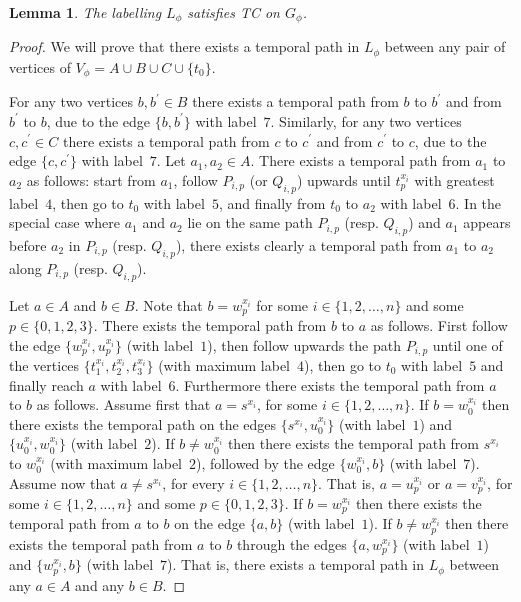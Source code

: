 \documentclass[a4paper,UKenglish]{article}
\newtheorem{lemma}{Lemma}
\begin{document}
\begin{lemma}
\label{lambda-reachabilities-preserve-lem}
The labelling $L_{\phi }$ satisfies TC on $G_{\phi} $.
\end{lemma}

\begin{proof}
We will prove that there exists a temporal path in $L _{\phi }$
between any pair of vertices of $V_{\phi }=A\cup B\cup C\cup \{t_{0}\}$. 

For any two vertices $b,b^{\prime }\in B$ there exists a temporal path from $b$ to $b^{\prime }$ and from $b^{\prime }$ to $b$, due to the edge $\{ b , b^{\prime }  \}$ with label~$7$. Similarly, for any two vertices $c,c^{\prime
}\in C$ there exists a temporal path from $c$ to $c^{\prime }$ and from $c^{\prime }$ to $c$, due to the edge $  \{  c  ,  c^{\prime }  \}  $ with label~$7$. Let $a_{1},a_{2}\in A$. There exists a temporal path from $a_{1}$ to $a_{2}$ as
follows: start from $a_{1}$, follow $P_{i,p}$ (or $Q_{i,p}$) upwards until $t_{p}^{x_{i}}$ with greatest label~$4$, then go to $t_{0}$ with label~$5$,
and finally from $t_{0}$ to $a_{2}$ with label~$6$. In the special case
where $a_{1}$ and $a_{2}$ lie on the same path $P_{i,p}$ (resp. $Q_{i,p}$)
and $a_{1}$ appears before $a_{2}$ in $P_{i,p}$ (resp. $Q_{i,p}$), there
exists clearly a temporal path from $a_{1}$ to $a_{2}$ along $P_{i,p}$
(resp. $Q_{i,p}$).

Let $a\in A$ and $b\in B$. Note that $b=w_{p}^{x_{i}}$ for some $i\in
\{1,2,\ldots ,n\}$ and some $p\in \{0,1,2,3\}$. There exists the temporal
path from $b$ to $a$ as follows. First follow the edge $\{  w_{p}^{x_{i}}  ,  u_{p}^{x_{i}}  \} $ (with label~$1$), then follow upwards the path $P_{i,p}$ until one of the vertices $\{t_{1}^{x_{i}},t_{2}^{x_{i}},t_{3}^{x_{i}}\}$ (with maximum label~$4$),
then go to $t_{0}$ with label~$5$ and finally reach $a$ with label~$6$.
Furthermore there exists the temporal path from $a$ to $b$ as follows.
Assume first that $a=s^{x_{i}}$, for some $i\in \{1,2,\ldots ,n\}$. If $b=w_{0}^{x_{i}}$ then there exists the temporal path on the edges $\{  s^{x_{i}}  ,  u_{0}^{x_{i}}  \}  $ (with label~$1$) and $  \{  u_{0}^{x_{i}}  ,  w_{0}^{x_{i}}  \}$
(with label~$2$). If $b\neq w_{0}^{x_{i}}$ then there exists the temporal
path from $s^{x_{i}}$ to $w_{0}^{x_{i}}$ (with maximum label~$2$), followed
by the edge $\{  w_{0}^{x_{i}}  ,  b  \}  $ (with label~$7$). Assume now that $a\neq
s^{x_{i}}$, for every $i\in \{1,2,\ldots ,n\}$. That is, $a=u_{p}^{x_{i}}$
or $a=v_{p}^{x_{i}}$, for some $i\in \{1,2,\ldots ,n\}$ and some $p\in
\{0,1,2,3\}$. If $b=w_{p}^{x_{i}}$ then there exists the temporal path from $a$ to $b$ on the edge $\{ a , b \} $ (with label~$1$). If $b\neq w_{p}^{x_{i}}$ then
there exists the temporal path from $a$ to $b$ through the edges $\{ a , w_{p}^{x_{i}} \} $ (with label~$1$) and $  \{ w_{p}^{x_{i}}  ,  b  \} $ (with label~$7$). That
is, there exists a temporal path in $L _{\phi }$ between any $a\in A$
and any $b\in B$.


\end{proof}
\end{document}
